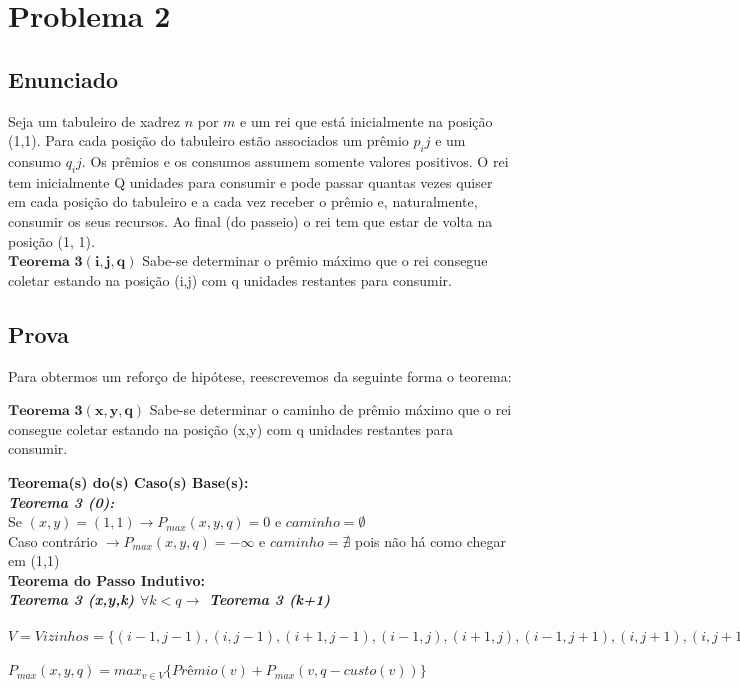 \documentclass[12pt]{article}
\begin{document}
\section{Problema 2}

\subsection{ Enunciado }
\indent Seja um tabuleiro de xadrez $n$ por $m$ e um rei que está inicialmente na posição (1,1). Para cada posição do tabuleiro estão associados um prêmio $p_ij$ e um consumo $q_ij$. Os prêmios e os consumos assumem somente valores positivos.
O rei tem inicialmente Q unidades para consumir e pode passar quantas vezes quiser em cada
posição do tabuleiro e a cada vez receber o prêmio e, naturalmente, consumir os seus recursos. Ao final (do passeio) o rei tem que estar de volta na posição (1, 1).\\

$\mathbf{Teorema}$ $\mathbf{3}$$\mathbf{(i,j,q)}$ Sabe-se determinar o prêmio máximo que o rei consegue coletar estando na posição (i,j) com q unidades restantes para consumir.\\

\subsection{ Prova }
Para obtermos um reforço de hipótese, reescrevemos da seguinte forma o teorema:

$\mathbf{Teorema}$ $\mathbf{3}$$\mathbf{(x,y,q)}$ Sabe-se determinar o caminho de prêmio máximo que o rei consegue coletar estando na posição (x,y) com q unidades restantes para consumir.\\

\indent 

\textbf{Teorema(s) do(s) Caso(s) Base(s):}\\

\textit{\textbf{Teorema 3 (0):}}\\
Se $ (x,y)=(1,1) \rightarrow P_{max}(x,y,q) = 0$ e $caminho = \emptyset $\\
Caso contrário $\rightarrow P_{max}(x,y,q) = -\infty $ e $caminho = \nexists $ pois não há como chegar em (1,1) \\ 

\textbf{Teorema do Passo Indutivo:}\\

\textit{\textbf{Teorema 3 (x,y,k) $\forall k < q \rightarrow$ Teorema 3 (k+1)}}\\
\\
$V = Vizinhos = \{(i-1,j-1),(i,j-1),(i+1,j-1),(i-1,j),(i+1,j),(i-1,j+1),(i,j+1),(i,j+1),(i+1,j+1)\}$\\ 
\\
$P_{max}(x,y,q) = max_{v \in V}\{Prêmio(v) + P_{max}(v,q-custo(v))\}$\\
\end{document}
